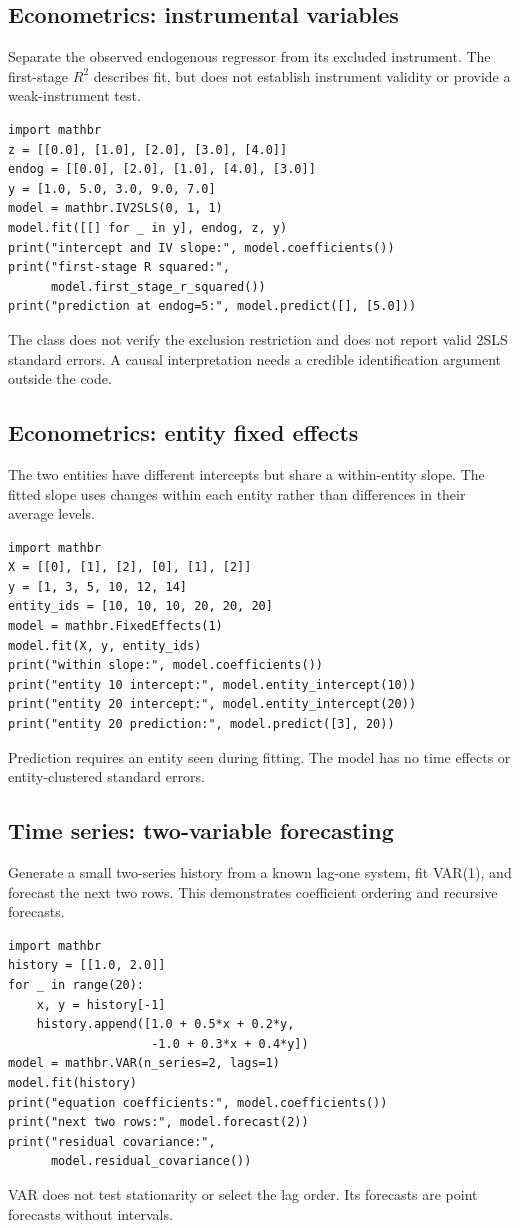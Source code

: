 \documentclass[11pt,a4paper]{article}
\begin{document}
\subsection{Econometrics: instrumental variables}
Separate the observed endogenous regressor from its excluded instrument. The first-stage $R^2$ describes fit, but does not establish instrument validity or provide a weak-instrument test.
\begin{verbatim}
import mathbr
z = [[0.0], [1.0], [2.0], [3.0], [4.0]]
endog = [[0.0], [2.0], [1.0], [4.0], [3.0]]
y = [1.0, 5.0, 3.0, 9.0, 7.0]
model = mathbr.IV2SLS(0, 1, 1)
model.fit([[] for _ in y], endog, z, y)
print("intercept and IV slope:", model.coefficients())
print("first-stage R squared:",
      model.first_stage_r_squared())
print("prediction at endog=5:", model.predict([], [5.0]))
\end{verbatim}
The class does not verify the exclusion restriction and does not report valid 2SLS standard errors. A causal interpretation needs a credible identification argument outside the code.

\subsection{Econometrics: entity fixed effects}
The two entities have different intercepts but share a within-entity slope. The fitted slope uses changes within each entity rather than differences in their average levels.
\begin{verbatim}
import mathbr
X = [[0], [1], [2], [0], [1], [2]]
y = [1, 3, 5, 10, 12, 14]
entity_ids = [10, 10, 10, 20, 20, 20]
model = mathbr.FixedEffects(1)
model.fit(X, y, entity_ids)
print("within slope:", model.coefficients())
print("entity 10 intercept:", model.entity_intercept(10))
print("entity 20 intercept:", model.entity_intercept(20))
print("entity 20 prediction:", model.predict([3], 20))
\end{verbatim}
Prediction requires an entity seen during fitting. The model has no time effects or entity-clustered standard errors.

\subsection{Time series: two-variable forecasting}
Generate a small two-series history from a known lag-one system, fit VAR(1), and forecast the next two rows. This demonstrates coefficient ordering and recursive forecasts.
\begin{verbatim}
import mathbr
history = [[1.0, 2.0]]
for _ in range(20):
    x, y = history[-1]
    history.append([1.0 + 0.5*x + 0.2*y,
                    -1.0 + 0.3*x + 0.4*y])
model = mathbr.VAR(n_series=2, lags=1)
model.fit(history)
print("equation coefficients:", model.coefficients())
print("next two rows:", model.forecast(2))
print("residual covariance:",
      model.residual_covariance())
\end{verbatim}
VAR does not test stationarity or select the lag order. Its forecasts are point forecasts without intervals.
\end{document}
